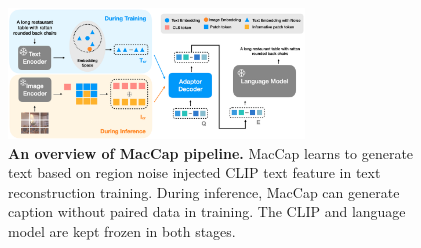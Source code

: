 


\begin{figure}[t!]
  \centering
  \includegraphics[width=0.7\textwidth]{AnonymousSubmission/LaTeX/asserts/new_pipeline.png}
   \caption{\textbf{An overview of MacCap pipeline.} MacCap learns to generate text based on region noise injected CLIP text feature in text reconstruction training. During inference, MacCap can generate caption without paired data in training. The CLIP and language model are kept frozen in both stages. }
    \label{figure:pipeline}
\end{figure}
